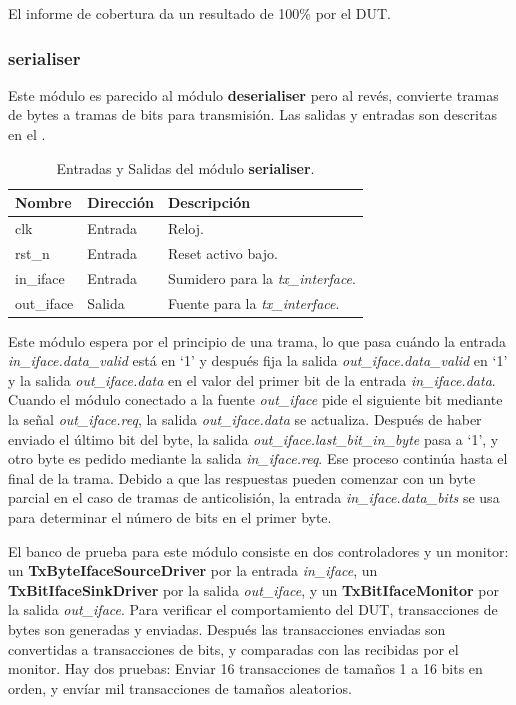 \documentclass[a4paper, twoside, 11pt]{report}
\begin{document}
El informe de cobertura da un resultado de 100\% por el DUT.

\FloatBarrier
\subsubsection{serialiser}

Este módulo es parecido al módulo \textbf{deserialiser} pero al revés, convierte tramas de bytes a tramas de bits para transmisión. Las salidas y entradas son descritas en el .

\begin{table}[htb]
  \centering
  \tablezebra
  \begin{tabulary}{\linewidth}{l|l|L}
    \textbf{Nombre}&\textbf{Dirección}&\textbf{Descripción} \\
    \hline
    clk&Entrada&Reloj. \\
    rst\_n&Entrada&Reset activo bajo. \\
    in\_iface&Entrada&Sumidero para la \textit{tx\_interface}. \\
    out\_iface&Salida&Fuente para la \textit{tx\_interface}. \\
  \end{tabulary}
  \caption{Entradas y Salidas del módulo \textbf{serialiser}.}
  \label{tab:ports_serialiser}
\end{table}

Este módulo espera por el principio de una trama, lo que pasa cuándo la entrada \textit{in\_iface.data\_valid} está en ‘1’ y después fija la salida \textit{out\_iface.data\_valid} en ‘1’ y la salida \textit{out\_iface.data} en el valor del primer bit de la entrada \textit{in\_iface.data}. Cuando el módulo conectado a la fuente \textit{out\_iface} pide el siguiente bit mediante la señal \textit{out\_iface.req}, la salida \textit{out\_iface.data} se actualiza. Después de haber enviado el último bit del byte, la salida \textit{out\_iface.last\_bit\_in\_byte} pasa a ‘1’, y otro byte es pedido mediante la salida \textit{in\_iface.req}. Ese proceso continúa hasta el final de la trama. Debido a que las respuestas pueden comenzar con un byte parcial en el caso de tramas de anticolisión, la entrada \textit{in\_iface.data\_bits} se usa para determinar el número de bits en el primer byte.

El banco de prueba para este módulo consiste en dos controladores y un monitor: un \textbf{TxByteIfaceSourceDriver} por la entrada \textit{in\_iface}, un \textbf{TxBitIfaceSinkDriver} por la salida \textit{out\_iface}, y un \textbf{TxBitIfaceMonitor} por la salida \textit{out\_iface}. Para verificar el comportamiento del DUT, transacciones de bytes son generadas y enviadas. Después las transacciones enviadas son convertidas a transacciones de bits, y comparadas con las recibidas por el monitor. Hay dos pruebas: Enviar 16 transacciones de tamaños 1 a 16 bits en orden, y envíar mil transacciones de tamaños aleatorios.
\end{document}
